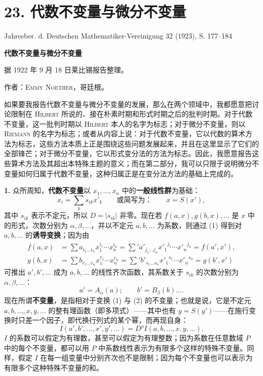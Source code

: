 \documentclass[11pt]{article}
\newcommand{\D}{\mathit D}
\newcommand{\srcemph}[1]{\textbf{#1}}
\newcommand{\srcname}[1]{\textsc{#1}}
\newcommand{\srcnumdisplay}[2]{\begin{equation}\tag{#1}#2\end{equation}}
\begin{document}
\section*{23. 代数不变量与微分不变量}
\begin{center}
Jahresber. d. Deutschen Mathematiker-Vereinigung 32 (1923), S. 177--184
\end{center}

\begin{center}
{\Large\bfseries 代数不变量与微分不变量}\par
\vspace{0.45em}
据 1922 年 9 月 18 日莱比锡报告整理。\par
\vspace{1.0em}
作者：\textsc{Emmy Noether}，哥廷根。
\end{center}

\begingroup
\renewcommand{\thefootnote}{\arabic{footnote})}
\setcounter{footnote}{0}

如果要我报告代数不变量与微分不变量的发展，那么在两个领域中，我都愿意把讨论限制在 \srcname{Hilbert} 所说的、接在朴素时期和形式时期之后的批判时期。对于代数不变量，这一批判时期以 \srcname{Hilbert} 本人的名字为标志；对于微分不变量，则以 \srcname{Riemann} 的名字为标志；或者从内容上说：对于代数不变量，它以代数的算术方法为标志，这些方法本质上正是围绕这些问题发展起来，并且在这里显示了它们的全部锋芒；对于微分不变量，它以形式变分法的方法为标志。因此，我愿意报告这些算术方法及其超出本特殊主题的意义；而在第二部分，我可以只限于说明微分不变量如何归属于代数不变量，这种归属正是在变分法方法的基础上完成的。

\textbf{1.} 众所周知，\srcemph{代数不变量}以 $x_1,\ldots,x_n$ 中的\srcemph{一般线性群}为基础：
\srcnumdisplay{1}{x_i=\sum_k s_{ik}x'_k
\qquad\text{或简写为：}\qquad x=S(x'),}
其中 $s_{ik}$ 表示不定元，所以 $\D=|s_{ik}|$ 非零。现在若 $f(a,x),g(b,x),\ldots$ 是 $x$ 中的形式，次数分别为 $\alpha,\beta,\ldots$，并以不定元 $a,b,\ldots$ 为系数，则通过 (1) 得到对 $a,b,\ldots$ 的\srcemph{诱导变换}；因为由
\[
\begin{aligned}
f(a,x)&=\sum a_{i_1\ldots i_n}x_1^{i_1}\cdots x_n^{i_n}
      =\sum{}' a'_{j_1\ldots j_n}{x'_1}^{j_1}\cdots {x'_n}^{j_n}
      =f(a',x'),\\
g(b,x)&=\sum b_{r_1\ldots r_n}x_1^{r_1}\cdots x_n^{r_n}
      =\sum{}' b'_{s_1\ldots s_n}{x'_1}^{s_1}\cdots {x'_n}^{s_n}
      =g(b',x')
\end{aligned}
\]
可推出 $a',b',\ldots$ 成为 $a,b,\ldots$ 的线性齐次函数，其系数关于 $s_{ik}$ 的次数分别为 $\alpha,\beta,\ldots$：
\srcnumdisplay{2}{a'=A_\alpha(a);\qquad b'=B_\beta(b)\ldots .}
现在所谓\srcemph{不变量}，是指相对于变换 (1) 与 (2) 的不变量；也就是说，它是不定元 $a,b,\ldots,x,y,\ldots$ 的整有理函数（即多项式）——其中也有 $y=S(y')$——在施行变换时只差一个因子，即代换行列式的某个幂，而再现自身：
\srcnumdisplay{3}{I(a',b',\ldots,x',y',\ldots)=\D^\rho I(a,b,\ldots,x,y,\ldots).}
$I$ 的系数可以假定为有理数，甚至可以假定为有理整数；因为系数在任意数域 $P$ 中的每个不变量，都可以用 $P$ 中系数线性表示为有限多个这样的特殊不变量。同样，假定 $I$ 在每一组变量中分别齐次也不是限制；因为每个不变量也可以表示为有限多个这种特殊不变量的和。
\end{document}

